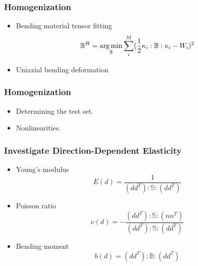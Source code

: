 \documentclass[serif,mathserif, 12pt]{beamer}
\newcommand{\argmin}{\operatornamewithlimits{arg\min}}
\begin{document}
\begin{frame}
  \frametitle{Homogenization}
  \begin{itemize}
  \item Bending material tensor fitting
    \[
    \mathbb{B}^H = \argmin_{\mathbb{B}}\sum_i^M (\frac{1}{2}\kappa_i:\mathbb{B}:\kappa_i-W_i)^2
    \]
  \item<2> Uniaxial bending deformation
  \end{itemize}
\end{frame}

\begin{frame}
  \frametitle{Homogenization}
  \begin{itemize}
  \item Determining the test set.
  \item Nonlinearities.
  \end{itemize}  
\end{frame}

\begin{frame}
  \frametitle{Investigate Direction-Dependent Elasticity}
  \begin{itemize}
  \item Young's modulus
    \[
    E(d) = \frac{1}{(dd^T):\mathbb{S}:(dd^T)}
    \]
  \item Poisson ratio
    \[
    \nu(d) = -\frac{(dd^T):\mathbb{S}:(nn^T)}{(dd^T):\mathbb{S}:(dd^T)}
    \]
  \item Bending moment
    \[
    b(d) = (dd^T):\mathbb{B}:(dd^T)
    \]
  \end{itemize}
\end{frame}
\end{document}
